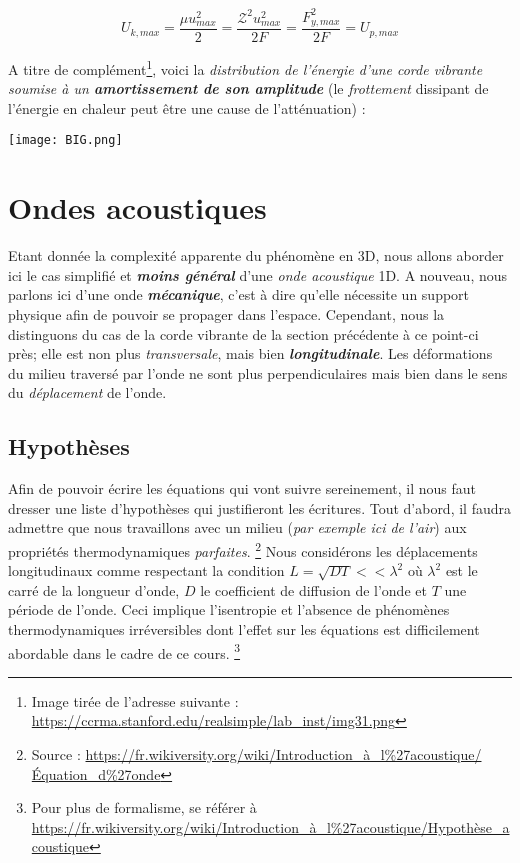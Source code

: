 \[ U_{k,max} = \frac{\mu u_{max}^{2}}{2} =   \frac{\mathcal{Z}^{2} u_{max}^{2}}{2F} = \frac{F_{y,max}^{2}}{2F} = U_{p,max}\]

A titre de complément\footnote{Image tirée de l'adresse suivante : \url{https://ccrma.stanford.edu/realsimple/lab_inst/img31.png}}, voici la \textit{distribution de l'énergie d'une corde vibrante soumise à un \textbf{amortissement de son amplitude}} (le \textit{frottement }dissipant de l'énergie en chaleur peut être une cause de l'atténuation) : 
\begin{center}
	\texttt{[image: BIG.png]}
\end{center}

\section{Ondes acoustiques}

Etant donnée la complexité apparente du phénomène en 3D, nous allons aborder ici le cas simplifié et \textit{\textbf{moins général}} d'une 
\textit{onde acoustique} 1D. A nouveau, nous parlons ici d'une onde \textit{\textbf{mécanique}}, c'est à dire qu'elle nécessite un support physique afin 
de pouvoir se propager dans l'espace. Cependant, nous la distinguons du cas de la corde vibrante de la section précédente à ce point-ci près; 
elle est non plus \textit{transversale}, mais bien \textit{\textbf{longitudinale}}. Les déformations du milieu traversé par l'onde ne sont plus perpendiculaires mais 
bien dans le sens du
\textit{déplacement}
de l'onde.

\subsection{Hypothèses}

Afin de pouvoir écrire les équations qui vont suivre sereinement, il nous faut dresser une liste d'hypothèses qui justifieront les écritures. 
Tout d'abord, il faudra admettre que nous travaillons avec un milieu (\textit{par exemple ici de l'air}) aux propriétés thermodynamiques \textit{parfaites}. \footnote{Source : \url{https://fr.wikiversity.org/wiki/Introduction_à_l\%27acoustique/Équation_d\%27onde}}
Nous considérons les déplacements longitudinaux comme respectant la condition $L = \sqrt{DT} << \lambda^{2}$ où $\lambda^{2}$ est le carré de la longueur d'onde, $D$ le coefficient de diffusion de l'onde et 
$T$ une période de l'onde. Ceci implique l'isentropie et l'absence de phénomènes thermodynamiques irréversibles dont l'effet sur les équations est difficilement abordable dans le cadre de ce cours. \footnote{Pour plus de formalisme, se référer à \url{https://fr.wikiversity.org/wiki/Introduction_à_l\%27acoustique/Hypothèse_acoustique}}

